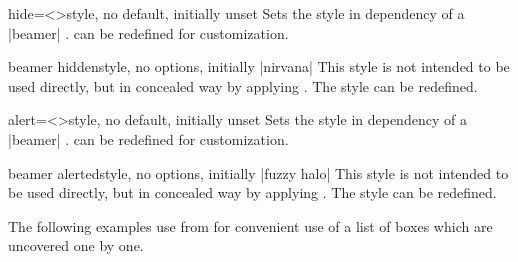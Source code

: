 \begin{docTcbKey}[][doc new={2019-03-01}]{hide}{=\textless{}\textgreater}{style, no default, initially unset}
Sets the  style in dependency of
a |beamer| .
 can be redefined for customization.
\end{docTcbKey}


\begin{docTcbKey}[][doc new={2019-03-01}]{beamer hidden}{}{style, no options, initially |nirvana|}
This style is not intended to be used directly, but in concealed way by applying
. The style can be redefined.
\begin{dispListing}
\end{dispListing}
\end{docTcbKey}

\clearpage

\begin{docTcbKey}[][doc new={2019-03-01}]{alert}{=\textless{}\textgreater}{style, no default, initially unset}
Sets the  style in dependency of
a |beamer| .
 can be redefined for customization.
\end{docTcbKey}


\begin{docTcbKey}[][doc new={2019-03-01}]{beamer alerted}{}{style, no options, initially |fuzzy halo|}
This style is not intended to be used directly, but in concealed way by applying
. The style can be redefined.
\begin{dispListing}
\end{dispListing}
\end{docTcbKey}


\bigskip

The following examples use  from  for
convenient use of a list of boxes which are uncovered one by one.



